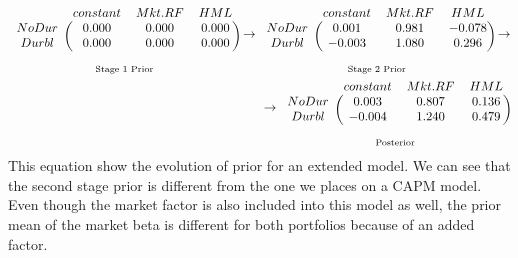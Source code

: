 \begin{eqnarray*}
\underset{\text{Stage 1 Prior}}
{\begin{blockarray}{cccc}
	& constant & Mkt.RF & HML \\ 
	\begin{block}{c(ccc )}
	NoDur & 0.000 & 0.000 & 0.000 \\ 
	Durbl & 0.000 & 0.000 & 0.000 \\ 
	\end{block}
\end{blockarray} }
\rightarrow
\underset{\text{Stage 2 Prior}}
{\begin{blockarray}{cccc}
	& constant & Mkt.RF & HML\\ 
	\begin{block}{c(ccc)}
NoDur & 0.001 & 0.981 & -0.078 \\ 
Durbl & -0.003 & 1.080 & 0.296 \\ 
	\end{block}
\end{blockarray} }
\rightarrow \\
\rightarrow
\underset{\text{Posterior}}
{\begin{blockarray}{cccc}
	& constant & Mkt.RF & HML \\ 
	\begin{block}{c(ccc)}
	NoDur & 0.003 & 0.807 & 0.136 \\ 
	Durbl & -0.004 & 1.240 & 0.479 \\ 
	\end{block}
\end{blockarray} }
\end{eqnarray*}
This equation show the evolution of prior for an extended model. 
We can see that the second stage prior is different from the one we places on a CAPM model. 
Even though the market factor is also included into this model as well, the prior mean of the market beta is different for both portfolios because of an added factor.

